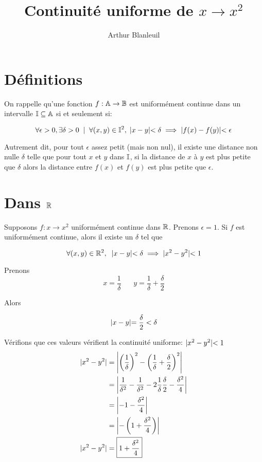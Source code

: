 \documentclass[a4paper, 14pt]{article}
\begin{document}
\title{Continuité uniforme de $x \to x^2$}
\author{Arthur Blanleuil}

\maketitle

\section{Définitions}

On rappelle qu'une fonction $f : \mathbb{A} \to \mathbb{B}$ est uniformément continue
dans un intervalle $\mathbb{I} \subseteq \mathbb{A}$ si et seulement si:

\[
  \forall \epsilon > 0, \exists \delta > 0 \;\;|\;\; \forall (x, y) \in
  \mathbb{I}^2,\; \lvert x - y \lvert < \delta \implies \lvert f(x) - f(y) \lvert < \epsilon
\]

Autrement dit, pour tout $\epsilon$ assez petit (mais non nul), il existe une distance non
nulle $\delta$ telle que pour tout $x$ et $y$ dans $\mathbb{I}$, si la distance de
$x$ à $y$ est plus petite que $\delta$ alors la distance entre $f(x)$ et $f(y)$
est plus petite que $\epsilon$.

\section{Dans $\mathbb{R}$}

Supposons $f : x \to x^2$ uniformément continue dans $\mathbb{R}$. Prenons
$\epsilon = 1$. Si $f$ est uniformément continue, alors il existe un $\delta$
tel que

\[
  \forall (x, y) \in \mathbb{R}^2, \;\; \lvert x - y \lvert < \delta
  \implies \lvert x^2 - y^2 \lvert < 1
\]

Prenons 
\[
  x = \frac{1}{\delta}\;\;\;\;\;\; y = \frac{1}{\delta} + \frac{\delta}{2}
\]

Alors

\[
  \lvert x - y \lvert = \frac{\delta}{2} < \delta
\]

Vérifions que ces valeurs vérifient la continuité uniforme: $\lvert x^2 - y^2 \lvert < 1$
\begin{align*}
  \lvert x^2 - y^2 \lvert &= \left\lvert \left(\frac{1}{\delta}\right)^2 - \left(\frac{1}{\delta} +
  \frac{\delta}{2}\right)^2 \right\lvert \\
  &= \left\lvert \frac{1}{\delta^2} - \frac{1}{\delta^2} -
    2\frac{1}{\delta}\frac{\delta}{2} - \frac{\delta^2}{4} \right\lvert\\
  &= \left\lvert - 1 - \frac{\delta^2}{4} \right\lvert\\
  &= \left\lvert - \left(1 + \frac{\delta^2}{4} \right) \right\lvert \\
  \lvert x^2 - y^2 \lvert &= \boxed{1 + \frac{\delta^2}{4}}
\end{align*}
\end{document}
